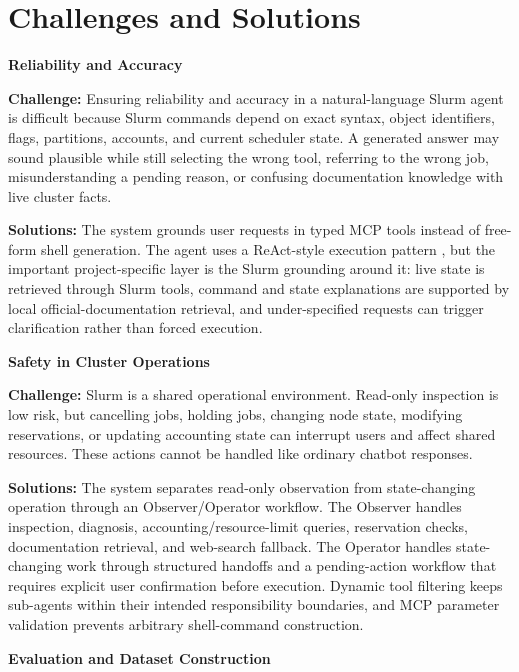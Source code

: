 \section{Challenges and Solutions}
\label{sec:challenges}

\noindent\textbf{Reliability and Accuracy}

\textbf{Challenge:} Ensuring reliability and accuracy in a natural-language Slurm agent is difficult because Slurm commands depend on exact syntax, object identifiers, flags, partitions, accounts, and current scheduler state. A generated answer may sound plausible while still selecting the wrong tool, referring to the wrong job, misunderstanding a pending reason, or confusing documentation knowledge with live cluster facts.

\textbf{Solutions:} The system grounds user requests in typed MCP tools instead of free-form shell generation. The agent uses a ReAct-style execution pattern \cite{yao2022react}, but the important project-specific layer is the Slurm grounding around it: live state is retrieved through Slurm tools, command and state explanations are supported by local official-documentation retrieval, and under-specified requests can trigger clarification rather than forced execution.

\noindent\textbf{Safety in Cluster Operations}

\textbf{Challenge:} Slurm is a shared operational environment. Read-only inspection is low risk, but cancelling jobs, holding jobs, changing node state, modifying reservations, or updating accounting state can interrupt users and affect shared resources. These actions cannot be handled like ordinary chatbot responses.

\textbf{Solutions:} The system separates read-only observation from state-changing operation through an Observer/Operator workflow. The Observer handles inspection, diagnosis, accounting/resource-limit queries, reservation checks, documentation retrieval, and web-search fallback. The Operator handles state-changing work through structured handoffs and a pending-action workflow that requires explicit user confirmation before execution. Dynamic tool filtering keeps sub-agents within their intended responsibility boundaries, and MCP parameter validation prevents arbitrary shell-command construction.

\noindent\textbf{Evaluation and Dataset Construction}

